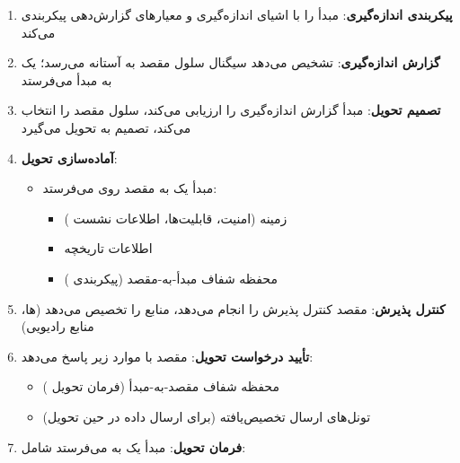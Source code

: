 \begin{enumerate}
\def\labelenumi{\arabic{enumi}.}
\tightlist
\item
  \textbf{پیکربندی اندازه‌گیری}:  مبدأ  را با اشیای اندازه‌گیری و معیارهای گزارش‌دهی پیکربندی می‌کند
\item
  \textbf{گزارش اندازه‌گیری}:  تشخیص می‌دهد سیگنال سلول مقصد به آستانه می‌رسد؛ یک  به  مبدأ می‌فرستد
\item
  \textbf{تصمیم تحویل}:  مبدأ گزارش اندازه‌گیری را ارزیابی می‌کند، سلول مقصد را انتخاب می‌کند، تصمیم به تحویل می‌گیرد
\item
  \textbf{آماده‌سازی تحویل}:

  \begin{itemize}
  \tightlist
  \item
     مبدأ یک  به  مقصد روی  می‌فرستد:

    \begin{itemize}
    \tightlist
    \item
      زمینه  (امنیت، قابلیت‌ها، اطلاعات نشست )
    \item
      اطلاعات تاریخچه 
    \item
      محفظه شفاف مبدأ-به-مقصد (پیکربندی )
    \end{itemize}
  \end{itemize}
\item
  \textbf{کنترل پذیرش}:  مقصد کنترل پذیرش را انجام می‌دهد، منابع را تخصیص می‌دهد (ها، منابع رادیویی)
\item
  \textbf{تأیید درخواست تحویل}:  مقصد با موارد زیر پاسخ می‌دهد:

  \begin{itemize}
  \tightlist
  \item
    محفظه شفاف مقصد-به-مبدأ (فرمان تحویل )
  \item
    تونل‌های ارسال  تخصیص‌یافته (برای ارسال داده در حین تحویل)
  \end{itemize}
\item
  \textbf{فرمان تحویل}:  مبدأ یک  به  می‌فرستد شامل:


\end{enumerate}
